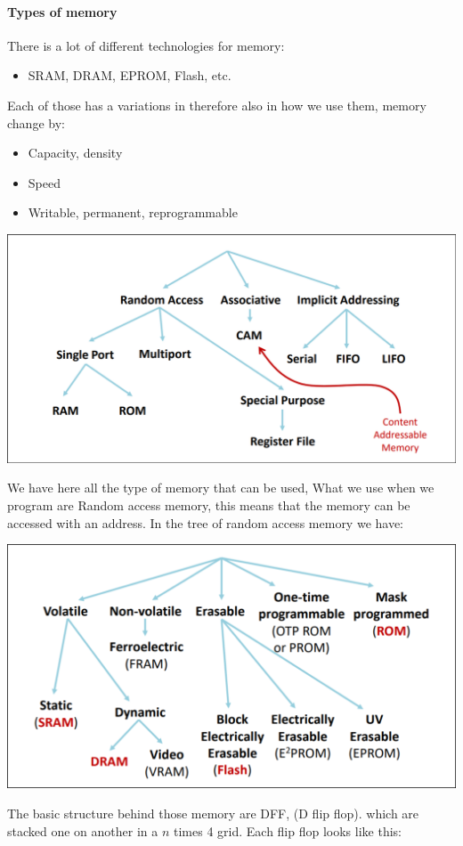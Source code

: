 	\paragraph{Types of memory}
	There is a lot of different technologies for memory:
	\begin{itemize}
		\item SRAM, DRAM, EPROM, Flash, etc.
\end{itemize}
Each of those has a variations in  therefore also in how we use them, memory change by:
\begin{itemize}
	\item Capacity, density 
	\item Speed 
	\item Writable, permanent, reprogrammable
\end{itemize}
\begin{center}
\includegraphics[scale=0.4]{screenshots/2025-10-11_8.png}
\end{center}
We have here all the type of memory that can be used, What we use when we program are Random access memory, this means that the memory can be accessed with an address. In the tree of random access memory we have:
\begin{center}
\includegraphics[scale=0.4]{screenshots/2025-10-11_9.png}
\end{center}
The basic structure behind those memory are DFF, (D flip flop). which are stacked one on another in a $n$ times 4 grid. Each flip flop looks like this:
